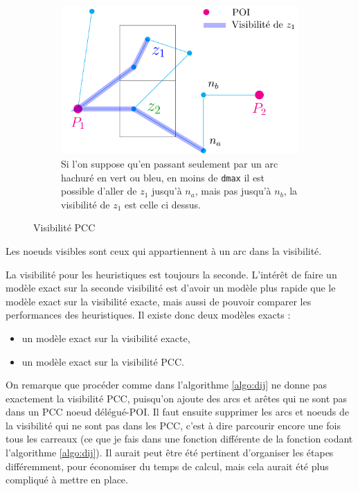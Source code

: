\begin{figure}[!ht]
    \hfill
    \begin{subfigure}[t]{0.3\textwidth}
        \centering
        \includegraphics[width=1\linewidth]{PDFs/visi_z1.pdf}
    \caption{Si l'on suppose qu'en passant seulement par un arc hachuré en vert ou bleu, en moins de \texttt{dmax} il est possible d'aller de $z_1$ jusqu'à $n_a$, mais pas jusqu'à $n_b$, la visibilité de $z_1$ est celle ci dessus.}
    \end{subfigure}
    \caption{Visibilité PCC}
    \label{fig:smallvisi}
\end{figure}

Les noeuds visibles sont ceux qui appartiennent à un arc dans la visibilité.

La visibilité pour les heuristiques est toujours la seconde. L'intérêt de faire un modèle exact sur la seconde visibilité est d'avoir un modèle plus rapide que le modèle exact sur la visibilité exacte, mais aussi de pouvoir comparer les performances des heuristiques. Il existe donc deux modèles exacts :
\begin{itemize}
    \item un modèle exact sur la visibilité exacte,
    \item un modèle exact sur la visibilité PCC.
\end{itemize}

On remarque que procéder comme dans l'algorithme \ref{algo:dij} ne donne pas exactement la visibilité PCC, puisqu'on ajoute des arcs et arêtes qui ne sont pas dans un PCC noeud délégué-POI. Il faut ensuite supprimer les arcs et noeuds de la visibilité qui ne sont pas dans les PCC, c'est à dire parcourir encore une fois tous les carreaux (ce que je fais dans une fonction différente de la fonction codant l'algorithme \ref{algo:dij}). Il aurait peut être été pertinent d'organiser les étapes différemment, pour économiser du temps de calcul, mais cela aurait été plus compliqué à mettre en place.

